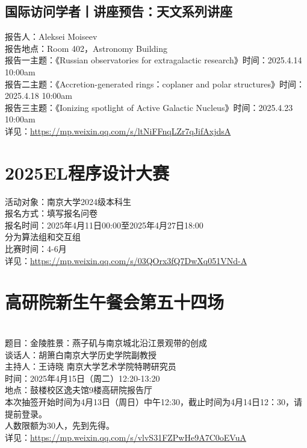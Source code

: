 \documentclass[letterpaper, 12pt]{article}
\begin{document}
\begin{multicols}{2}
\subsection{国际访问学者丨讲座预告：天文系列讲座}
报告人：Aleksei Moiseev
\\报告地点：Room 402，Astronomy Building
\\报告一主题：《Russian observatories for extragalactic research》时间：2025.4.14 10:00am
\\报告二主题：《Accretion-generated rings：coplaner and polar structures》时间：2025.4.18 10:00am
\\报告三主题：《Ionizing spotlight of Active Galactic Nucleus》时间：2025.4.23 10:00am
\\详见：\url{https://mp.weixin.qq.com/s/ltNiFFnqLZr7qJifAxjdsA}


\section{2025EL程序设计大赛}
活动对象：南京大学2024级本科生
\\报名方式：填写报名问卷
\\报名时间：2025年4月11日00:00至2025年4月27日18:00
\\分为算法组和交互组
\\比赛时间：4-6月
\\详见：\url{https://mp.weixin.qq.com/s/03QOrx3fQ7DwXq051VNd-A}

\section{高研院新生午餐会第五十四场}
\\题目：金陵胜景：燕子矶与南京城北沿江景观带的创成
\\谈话人：胡箫白南京大学历史学院副教授
\\主持人：王诗晓 南京大学艺术学院特聘研究员
\\时间：2025年4月15日（周二）12:20-13:20
\\地点：鼓楼校区逸夫馆9楼高研院报告厅
\\本次抽签开始时间为4月13日（周日）中午12:30，截止时间为4月14日12：30，请提前登录。
\\人数限额为30人，先到先得。
\\详见：\url{https://mp.weixin.qq.com/s/vlvS31FZPwHe9A7C0oEVuA}




\end{multicols}
\end{document}
